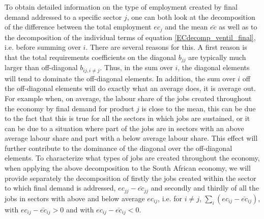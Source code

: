 \documentclass[12pt,english]{article}
\begin{document}
To obtain detailed information on the type of employment created by final demand addressed to a specific sector $j$, one can both look at the decomposition of the difference between the total employment $ec_j$ and the mean $\bar{ec}$ as well as to the decomposition of the individual terms of equation \ref{ECdecomp_ventil_final}, i.e. before summing over $i$. There are several reasons for this. A first reason is that the total requirements coefficients on the diagonal $b_{jj}$ are typically much larger than off-diagonal $b_{ij, i\neq j}$. Thus, in the sum over $i$, the diagonal elements will tend to dominate the off-diagonal elements. In addition, the sum over $i$ off the off-diagonal elements will do exactly what an average does, it is average out. For example when, on average, the labour share of the jobs created throughout the economy by final demand for product $j$ is close to the mean, this can be due to the fact that this is true for all the sectors in which jobs are sustained, or it can be due to a situation where part of the jobs are in sectors with an above average labour share and part with a below average labour share. This effect will further contribute to the dominance of the diagonal over the off-diagonal elements. %
To characterize what types of jobs are created throughout the economy, when applying the above decomposition to the South African economy, we will provide separately the decomposition of firstly the jobs created within the sector to which final demand is addressed, $ec_{jj} - \bar{ec}_{jj}$ and secondly and thirdly of all the jobs in sectors with above and below average $ec_{ij}$, i.e. for $i\neq j$, $\sum_i (ec_{ij} - \bar{ec}_{ij})$, with $ec_{ij} - \bar{ec}_{ij} >0$ and with $ec_{ij} - \bar{ec}_{ij} <0$.
\end{document}
